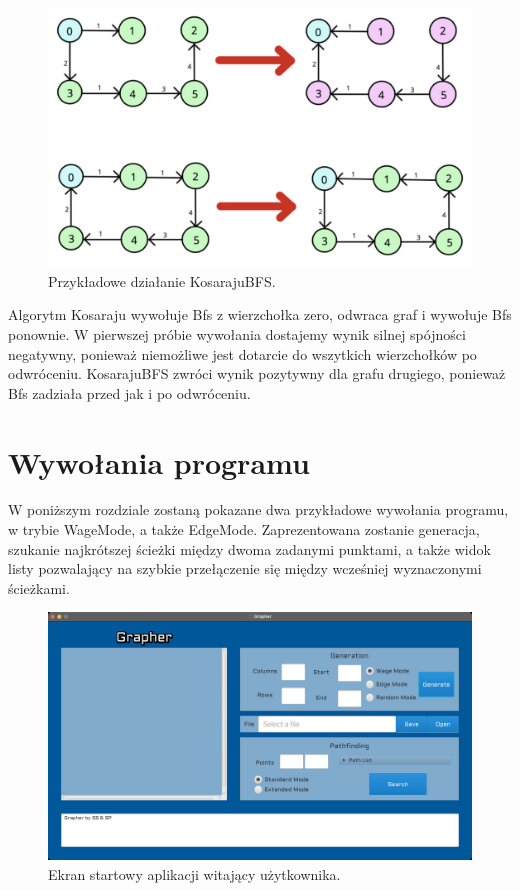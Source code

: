 \documentclass[10pt, a4paper]{report}
\begin{document}
\begin{figure}[h]
  \begin{center}
    \includegraphics[scale=0.19]{KosarajuInvertedBfsExample.jpg}
    \caption{Przykładowe działanie KosarajuBFS.}
  \end{center}
\end{figure}
Algorytm Kosaraju wywołuje Bfs z wierzchołka zero, odwraca graf i wywołuje Bfs ponownie. 
W pierwszej próbie wywołania dostajemy wynik silnej spójności negatywny, ponieważ niemożliwe jest dotarcie do wszytkich wierzchołków po odwróceniu. KosarajuBFS zwróci wynik pozytywny dla grafu drugiego, ponieważ Bfs zadziała przed jak i po odwróceniu.
\newpage

\section{Wywołania programu}\label{sec:wywołania-programu}
W poniższym rozdziale zostaną pokazane dwa przykładowe wywołania programu, w
trybie WageMode, a także EdgeMode.
Zaprezentowana zostanie generacja, szukanie najkrótszej ścieżki między dwoma
zadanymi punktami,
a także widok listy pozwalający na szybkie przełączenie się między wcześniej
wyznaczonymi ścieżkami.

\begin{figure}[h]
  \begin{center}
    \includegraphics[scale=0.165]{graperStartScreen.jpg}
    \caption{Ekran startowy aplikacji witający użytkownika.}
  \end{center}
\end{figure}
\end{document}
